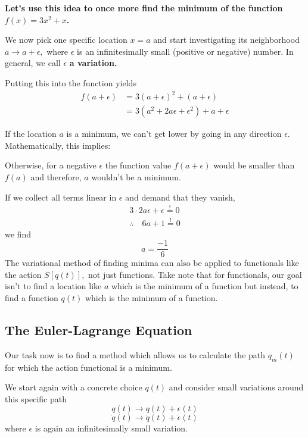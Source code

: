
\textbf{Let's use this idea to once more find the minimum of the function $f(x)=3 x^{2}+x$.}

We now pick one specific location $x=a$ and start investigating its neighborhood $a \rightarrow a+\epsilon,$ where $\epsilon$ is an infinitesimally small (positive or negative) number. In general, we call $\epsilon$ \textbf{a variation.}

Putting this into the function yields
$$
\begin{aligned} f(a+\epsilon) &=3(a+\epsilon)^{2}+(a+\epsilon) \\ &=3\left(a^{2}+2 a \epsilon+\epsilon^{2}\right)+a+\epsilon \end{aligned}
$$

If the location $a$ is a minimum, we can't get lower by going in any direction $\epsilon .$ Mathematically, this implies: 

 Otherwise, for a negative $\epsilon$ the function value $f(a+\epsilon)$ would be smaller than $f(a)$ and therefore, $a$ wouldn't be a minimum.

If we collect all terms linear in $\epsilon$ and demand that they vanish,
$$
\begin{array}{l}{3 \cdot 2 a \epsilon+\epsilon \stackrel{!}{=} 0} \\ {\therefore \quad 6 a+1 \stackrel{!}{=} 0}\end{array}
$$
we find
$$
a=\frac{-1}{6}
$$
The variational method of finding minima can also be applied to functionals like the action $S[q(t)],$ not just functions. Take note that for functionals, our goal isn't to find a location like $a$ which is the minimum of a function but instead, to find a function $q(t)$ which is the minimum of a function.

\subsection{The Euler-Lagrange Equation}
Our task now is to find a method which allows us to calculate
the path $q_m(t)$ for which the action functional is a minimum.

We start again with a concrete choice $q(t)$ and consider small variations around this specific path
\[
q(t) \rightarrow q(t)+\epsilon(t)
\]
$$
\dot{q}(t) \rightarrow \dot{q}(t)+\dot{\epsilon}(t)
$$
where $\epsilon$ is again an infinitesimally small variation.


